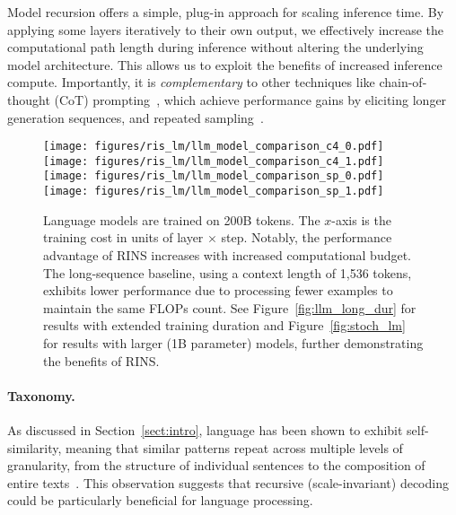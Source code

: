 Model recursion offers a simple, plug-in approach for scaling inference time. By applying some layers iteratively to their own output, we effectively increase the computational path length during inference without altering the underlying model architecture. This allows us to exploit the benefits of increased inference compute. Importantly, it is \emph{complementary} to other techniques like chain-of-thought (CoT) prompting~\cite{cot_paper}, which achieve performance gains by eliciting longer generation sequences, and repeated sampling~\cite{alphacode_paper,chen2021evaluatinglargelanguagemodels}.

\begin{figure*}[t]
    \centering
    \texttt{[image: figures/ris\_lm/llm\_model\_comparison\_c4\_0.pdf]}\hfill
    \texttt{[image: figures/ris\_lm/llm\_model\_comparison\_c4\_1.pdf]}\hfill
    \texttt{[image: figures/ris\_lm/llm\_model\_comparison\_sp\_0.pdf]}\hfill
    \texttt{[image: figures/ris\_lm/llm\_model\_comparison\_sp\_1.pdf]}\hfill\\
    \caption{Language models are trained on 200B tokens. The $x$-axis is the training cost in units of layer $\times$ step. Notably, the performance advantage of RINS increases with increased computational budget. The long-sequence baseline, using a context length of 1,536 tokens, exhibits lower performance due to processing fewer examples to maintain the same FLOPs count. See Figure~\ref{fig:llm_long_dur} for results with extended training duration and Figure~\ref{fig:stoch_lm} for results with larger (1B parameter) models, further demonstrating the benefits of RINS.}
    \label{fig:llm_sweep}
\end{figure*}

\paragraph{Taxonomy.}As discussed in Section~\ref{sect:intro}, language has been shown to exhibit self-similarity, meaning that similar patterns repeat across multiple levels of granularity, from the structure of individual sentences to the composition of entire texts~\cite{alabdulmohsin2024fractalpatternsilluminatesuccess}. This observation suggests that recursive (scale-invariant) decoding could be particularly beneficial for language processing. 

